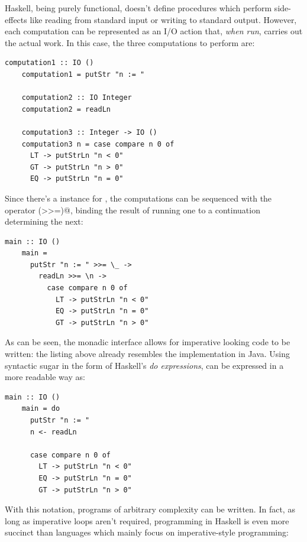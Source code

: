 \documentclass[UdineBachThesis,american,11pt]{PhdThesis}
\begin{document}
  Haskell, being purely functional, doesn't define procedures which perform
  side-effects like reading from standard input or writing to standard output.
  However, each computation can be represented as an I/O action that, \emph{when
  run}, carries out the actual work. In this case, the three computations to
  perform are:

  \begin{lstlisting}[gobble=4,basicstyle=\ttfamily\small]
    computation1 :: IO ()
    computation1 = putStr "n := "

    computation2 :: IO Integer
    computation2 = readLn

    computation3 :: Integer -> IO ()
    computation3 n = case compare n 0 of
      LT -> putStrLn "n < 0"
      GT -> putStrLn "n > 0"
      EQ -> putStrLn "n = 0"
  \end{lstlisting}

  Since there's a \lstinline@Monad@ instance for \lstinline@IO@, the
  computations can be sequenced with the operator \lstinline@(>>=)@, binding the
  result of running one to a continuation determining the next:

  \begin{lstlisting}[gobble=4,basicstyle=\ttfamily\small]
    main :: IO ()
    main =
      putStr "n := " >>= \_ ->
        readLn >>= \n ->
          case compare n 0 of
            LT -> putStrLn "n < 0"
            EQ -> putStrLn "n = 0"
            GT -> putStrLn "n > 0"
  \end{lstlisting}

  As can be seen, the monadic interface allows for imperative looking code to be
  written: the listing above already resembles the implementation in Java. Using
  syntactic sugar in the form of Haskell's \emph{do expressions},
  \lstinline@main@ can be expressed in a more readable way as:

  \begin{lstlisting}[gobble=4,basicstyle=\ttfamily\small]
    main :: IO ()
    main = do
      putStr "n := "
      n <- readLn

      case compare n 0 of
        LT -> putStrLn "n < 0"
        EQ -> putStrLn "n = 0"
        GT -> putStrLn "n > 0"
  \end{lstlisting}

  With this notation, programs of arbitrary complexity can be written. In fact,
  as long as imperative loops aren't required, programming in Haskell is even
  more succinct than languages which mainly focus on imperative-style
  programming:
\end{document}

